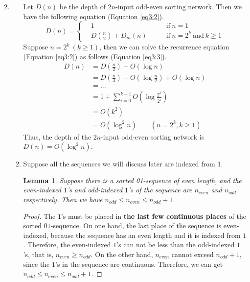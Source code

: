 \documentclass[12pt,a4paper]{article}
\makeatletter
\newtheorem{lemma}[theorem]{Lemma}
\newtheorem*{solution}{Solution}
\theoremstyle{definition}
\renewenvironment{solution}[1][Solution] {\par\pushQED{\qed}\normalfont\topsep6\p@\@plus6\p@\relax\trivlist\item[\hskip\labelsep\bfseries#1\@addpunct{.}]\ignorespaces}{\popQED\endtrivlist\@endpefalse} \makeatother
\makeatother
\begin{document}
\begin{enumerate}
\begin{solution}
\begin{enumerate}
        Let $D(n)$ be the depth of $2n$-input odd-even sorting network. Then we have the following equation (Equation \eqref{eq3:2}).
        \begin{equation}
        D(n) = \left\{
        \begin{aligned}
        & 1 & \quad \quad \mathrm{if\ } n = 1 \\
        & D\left(\frac{n}{2}\right) + D_m(n) & \quad \quad \mathrm{if\ } n = 2^k \mathrm{\ and\ } k \geq 1
        \end{aligned}
        \right.
        \label{eq3:2}
        \end{equation}
        Suppose $n = 2^k\ (k \ge 1)$, then we can solve the recurrence equation (Equation \eqref{eq3:2}) as follows (Equation \eqref{eq3:3}).
        \begin{equation}
        \begin{aligned}
        D(n) &= D\left(\frac{n}{2}\right) + O(\log{n}) \\
             &= D\left(\frac{n}{4}\right) + O\left(\log{\frac{n}{2}}\right) + O\left(\log{n}\right) \\
             &= ... \\
             &= 1 + \sum_{i=0}^{k-1} O\left(\log{\frac{2^k}{2^i}}\right) \\
             &= O(k^2) \\
             &= O(\log^2{n}) \quad \quad (n = 2^k, k \ge 1)
        \end{aligned}
        \label{eq3:3}
        \end{equation}
        Thus, the depth of the $2n$-input odd-even sorting network is $D(n) = O(\log^2{n})$.
    \item Suppose all the sequences we will discuss later are indexed from $1$.
        \begin{lemma}
            \label{lemma1}
            Suppose there is a sorted 01-sequence of even length, and the even-indexed $1$'s and odd-indexed $1$'s of the sequence are $n_{even}$ and $n_{odd}$ respectively. Then we have $n_{odd} \leq n_{even} \leq n_{odd} + 1$.
        \end{lemma}
        \begin{proof}
            The $1$'s must be placed in \textbf{the last few continuous places} of the sorted $01$-sequence. On one hand, the last place of the sequence is even-indexed, because the sequence has an even length and it is indexed from $1$. Therefore, the even-indexed $1$'s can not be less than the odd-indexed $1$'s, that is, $n_{even} \geq n_{odd}$. On the other hand, $n_{even}$ cannot exceed $n_{odd} + 1$, since the $1$'s in the sequence are continuous. Therefore, we can get $n_{odd} \leq n_{even} \leq n_{odd} + 1$.

\end{proof}
\end{enumerate}
\end{solution}
\end{enumerate}
\end{document}
